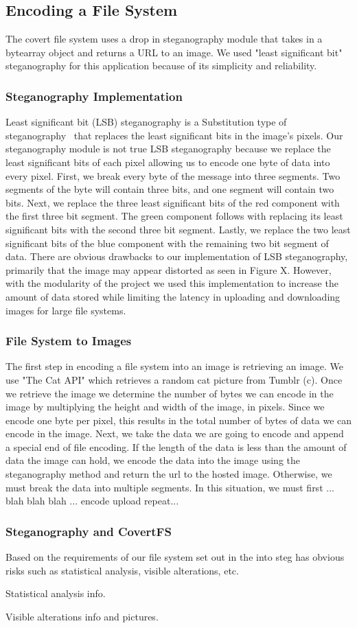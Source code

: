 \subsection{Encoding a File System}

The covert file system uses a drop in steganography module that takes in a bytearray object and returns a URL to an image. We used "least significant bit" steganography for this application because of its simplicity and reliability.

\subsubsection{Steganography Implementation}
Least significant bit (LSB) steganography is a Substitution type of steganography~\cite{Nosrati2011} that replaces the least significant bits in the image's pixels. Our steganography module is not true LSB steganography because we replace the least significant bits of each pixel allowing us to encode one byte of data into every pixel. First, we break every byte of the message into three segments. Two segments of the byte will contain three bits, and one segment will contain two bits. Next, we replace the three least significant bits of the red component with the first three bit segment. The green component follows with replacing its least significant bits with the second three bit segment. Lastly, we replace the two least significant bits of the blue component with the remaining two bit segment of data. There are obvious drawbacks to our implementation of LSB steganography, primarily that the image may appear distorted as seen in Figure X. However, with the modularity of the project we used this implementation to increase the amount of data stored while limiting the latency in uploading and downloading images for large file systems.
 
\subsubsection{File System to Images}
The first step in encoding a file system into an image is retrieving an image. We use "The Cat API" which retrieves a random cat picture from Tumblr (c). Once we retrieve the image we determine the number of bytes we can encode in the image by multiplying the height and width of the image, in pixels. Since we encode one byte per pixel, this results in the total number of bytes of data we can encode in the image. Next, we take the data we are going to encode and append a special end of file encoding. If the length of the data is less than the amount of data the image can hold, we encode the data into the image using the steganography method and return the url to the hosted image. Otherwise, we must break the data into multiple segments. In this situation, we must first ... blah blah blah ... encode upload repeat... 

\subsubsection{Steganography and CovertFS}
Based on the requirements of our file system set out in the into steg has obvious risks such as statistical analysis, visible alterations, etc.

Statistical analysis info.

Visible alterations info and pictures.

